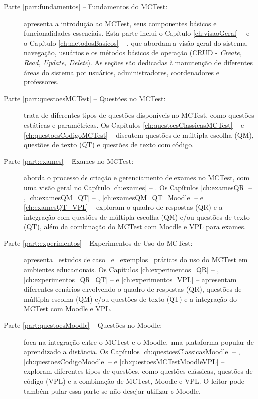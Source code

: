 \begin{description}
    
\item[Parte \ref{part:fundamentos} -- Fundamentos do MCTest:] apresenta a introdução ao MCTest, seus componentes básicos e funcionalidades essenciais. Esta parte inclui o Capítulo \ref{ch:visaoGeral} --  e o Capítulo \ref{ch:metodosBasicos} -- , que abordam a visão geral do sistema, navegação, usuários e os métodos básicos de operação (CRUD - \textit{Create, Read, Update, Delete}). As seções são dedicadas à manutenção de diferentes áreas do sistema por usuários, administradores, coordenadores e professores.

\item[Parte \ref{part:questoesMCTest} -- Questões no MCTest:] trata de diferentes tipos de questões disponíveis no MCTest, como questões estáticas e paramétricas. Os Capítulos \ref{ch:questoesClassicasMCTest}  --  e \ref{ch:questoesCodigoMCTest} --  discutem questões de múltipla escolha (QM), questões de texto (QT) e questões de texto com código.

\item[Parte \ref{part:exames} -- Exames no MCTest:] aborda o processo de criação e gerenciamento de exames no MCTest, com uma visão geral no Capítulo \ref{ch:exames} -- . Os Capítulos \ref{ch:examesQR}  -- , \ref{ch:examesQM_QT} -- , \ref{ch:examesQM_QT_Moodle} --  e \ref{ch:examesQT_VPL} --  exploram o quadro de respostas (QR) e a integração com questões de múltipla escolha (QM) e/ou questões de texto (QT), além da combinação do MCTest com Moodle e VPL para exames.

\item[Parte \ref{part:experimentos} -- Experimentos de Uso do MCTest:] apresenta \ estudos de caso \ e \ exemplos \ práticos do uso do MCTest em ambientes educacionais. Os Capítulos \ref{ch:experimentos_QR} -- , \ref{ch:experimentos_QR_QT} --  e \ref{ch:experimentos_VPL} --  apresentam diferentes cenários envolvendo o quadro de respostas (QR), questões de múltipla escolha (QM) e/ou questões de texto (QT) e a integração do MCTest com Moodle e VPL.

\item[Parte \ref{part:questoesMoodle} -- Questões no Moodle:] foca na integração entre o MCTest e o Moodle, uma plataforma popular de aprendizado a distância. Os Capítulos \ref{ch:questoesClassicasMoodle} -- , \ref{ch:questoesCodigoMoodle} --  e \ref{ch:questoesMCTestMoodleVPL} --  exploram diferentes tipos de questões, como questões clássicas, questões de código (VPL) e a combinação de MCTest, Moodle e VPL.  O leitor pode também pular essa parte se não desejar utilizar o Moodle.


\end{description}
